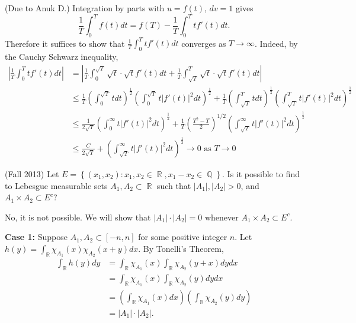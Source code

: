 \documentclass[answers]{exam}
\DeclareMathOperator{\RR}{\mathbb{R}}
\DeclareMathOperator{\QQ}{\mathbb{Q}}
\begin{document}
\begin{questions}
\begin{solution}
(Due to Anuk D.) Integration by parts with $u=f(t)$, $dv=1$ gives
\begin{equation*}
  \frac{1}{T}\int_{0}^{T}f(t)dt = f(T) - \frac{1}{T}\int_{0}^{T}tf'(t)dt.
\end{equation*}
Therefore it suffices to show that $\frac{1}{T}\int_{0}^{T}tf'(t)dt$ converges as $T\to \infty$. Indeed, by the Cauchy Schwarz inequality,
\begin{align*}
  \left|\frac{1}{T}\int_{0}^{T}tf'(t)dt\right|
  &= \left|\frac{1}{T}\int_{0}^{\sqrt{T}}\sqrt{t}\cdot\sqrt{t}f'(t)dt + \frac{1}{T}\int_{\sqrt{T}}^{T}\sqrt{t}\cdot \sqrt{t}f'(t)dt\right|\\
  & \leq \frac{1}{T}\left(\int_{0}^{\sqrt{T}}t dt \right)^{\frac{1}{2}}\left( \int_{0}^{\sqrt{T}}t |f'(t)|^{2}dt \right)^{\frac{1}{2}}+ \frac{1}{T}\left( \int_{\sqrt{T}}^{T}tdt \right)^{\frac{1}{2}}\left( \int_{\sqrt{T}}^{T}t|f'(t)|^{2}dt \right)^{\frac{1}{2}}\\
  &\leq \frac{1}{2 \sqrt{T}} \left(\int_{0}^{\infty}t|f'(t)|^{2} dt \right)^{\frac{1}{2}} + \frac{1}{T}\left( \frac{T^{2}-T}{2} \right)^{1/2}\left(\int_{\sqrt{T}}^{\infty}t|f'(t)|^{2}dt \right)^{\frac{1}{2}}\\
  &\leq \frac{C}{2 \sqrt{T}}  +\left(\int_{\sqrt{T}}^{\infty} t|f'(t)|^{2}dt \right)^{\frac{1}{2}} \to 0 \text{ as }T\to 0
\end{align*}
\end{solution}



\question (Fall 2013) Let $E= \left\{ (x_{1},x_{2}) : x_{1},x_{2}\in \RR, x_{1}-x_{2}\in \QQ\right\}$. Is it possible to find to Lebesgue measurable sets $A_{1},A_{2}\subset\RR$ such that $|A_{1}|,|A_{2}|>0$, and $A_{1}\times A_{2}\subset E^{c}$?
\begin{solution}
  No, it is not possible. We will show that $|A_{1}|\cdot|A_{2}| = 0$ whenever $A_{1}\times A_{2}\subset E^{c}$. 

 \textbf{ Case 1:} Suppose $A_{1},A_{2}\subset [-n,n]$ for some positive integer $n$.
  Let $h(y)= \int_{\RR}\chi_{A_{1}}(x)\chi_{A_{2}}(x+y)dx$. By Tonelli's Theorem,
  \begin{align*}
    \int_{\RR}h(y)dy
    &=\int_{\RR} \chi_{A_{1}}(x) \int_{\RR} \chi_{A_{2}}(y+x)dy dx\\
    &=\int_{\RR} \chi_{A_{1}}(x) \int_{\RR} \chi_{A_{2}}(y)dy dx\\
    &=\left(\int_{\RR} \chi_{A_{1}}(x)dx\right)\left( \int_{\RR} \chi_{A_{2}}(y)dy\right)\\
    &=|A_{1}|\cdot |A_{2}|.
  \end{align*}


\end{solution}
\end{questions}
\end{document}
